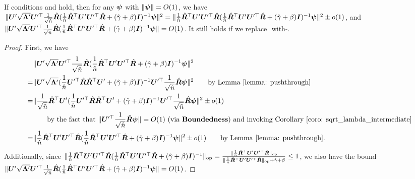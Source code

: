 \begin{corollary}\label{coro: sqrt_lambda}
If conditions \bounded{} and \conc{} hold, then for any ${\bm{\psi}}$ with $\|{\bm{\psi}}\|=O(1)$, we have $\| {\bm{U}}' \sqrt{{\bm{\Lambda}}'}{\bm{U}}'^\top\frac{1}{\sqrt{\hat{n}}} \hat{{\bm{R}}}(\frac{1}{\hat{n}}\hat{{\bm{R}}}^\top{\bm{U}}'{\bm{U}}'^\top\hat{{\bm{R}}} +(\hat{\gamma}+\beta){\bm{I}} )^{-1} {\bm{\psi}}  \|^2 =  \| \frac{1}{\hat{n}}\hat{{\bm{R}}}^\top {\bm{U}}'{\bm{U}}'^\top \hat{{\bm{R}}} ( \frac{1}{\hat{n}}\hat{{\bm{R}}}^\top{\bm{U}}'{\bm{U}}'^\top\hat{{\bm{R}}} + (\hat{\gamma}+\beta){\bm{I}} )^{-1} {\bm{\psi}}\|^2  \pm o(1) $, and $\| {\bm{U}}' \sqrt{{\bm{\Lambda}}'}{\bm{U}}'^\top\frac{1}{\sqrt{\hat{n}}} \hat{{\bm{R}}}(\frac{1}{\hat{n}}\hat{{\bm{R}}}^\top{\bm{U}}'{\bm{U}}'^\top\hat{{\bm{R}}} +(\hat{\gamma}+\beta){\bm{I}} )^{-1} {\bm{\psi}}  \| = O(1)$. It still holds if we replace $\hat{}$ with $\tilde{}$.
\end{corollary}
\begin{proof}
First, we have
    \begin{align}
\nonumber
   & \| {\bm{U}}' \sqrt{{\bm{\Lambda}}'}{\bm{U}}'^\top\frac{1}{\sqrt{\hat{n}}} \hat{{\bm{R}}}(\frac{1}{\hat{n}}\hat{{\bm{R}}}^\top{\bm{U}}'{\bm{U}}'^\top\hat{{\bm{R}}} +(\hat{\gamma}+\beta){\bm{I}} )^{-1} {\bm{\psi}}  \|^2 \\
   \nonumber
   = & \| {\bm{U}}' \sqrt{{\bm{\Lambda}}'}(\frac{1}{\hat{n}}{\bm{U}}'^\top\hat{{\bm{R}}}\hat{{\bm{R}}}^\top{\bm{U}}' +(\hat{\gamma}+\beta){\bm{I}} )^{-1}{\bm{U}}'^\top\frac{1}{\sqrt{\hat{n}}} \hat{{\bm{R}}} {\bm{\psi}}  \|^2 \quad\quad\text{by Lemma \ref{lemma: pushthrough}} \\
    \nonumber
    = & \| \frac{1}{\sqrt{\hat{n}}}\hat{{\bm{R}}}^\top {\bm{U}}' ( \frac{1}{\hat{n}}{\bm{U}}'^\top\hat{{\bm{R}}}\hat{{\bm{R}}}^\top{\bm{U}}' + (\hat{\gamma}+\beta){\bm{I}} )^{-1}{\bm{U}}'^\top\frac{1}{\sqrt{\hat{n}}} \hat{{\bm{R}}} {\bm{\psi}}\|^2  \pm o(1) \\
    \nonumber
   & \quad\quad\text{by the fact that $\|  {\bm{U}}'^\top\frac{1}{\sqrt{\hat{n}} }\hat{{\bm{R}}}{\bm{\psi}}\|=O(1)$ (via \textbf{Boundedness}{}) and invoking Corollary \ref{coro: sqrt_lambda_intermediate} }  \\
    \nonumber
    = & \| \frac{1}{\hat{n}}\hat{{\bm{R}}}^\top {\bm{U}}'{\bm{U}}'^\top \hat{{\bm{R}}} ( \frac{1}{\hat{n}}\hat{{\bm{R}}}^\top{\bm{U}}'{\bm{U}}'^\top\hat{{\bm{R}}} + (\hat{\gamma}+\beta){\bm{I}} )^{-1} {\bm{\psi}}\|^2  \pm o(1)  \quad\quad\text{by Lemma \ref{lemma: pushthrough}}.
\end{align}
Additionally, since $\lVert  \frac{1}{\hat{n}}\hat{{\bm{R}}}^\top {\bm{U}}'{\bm{U}}'^\top \hat{{\bm{R}}} ( \frac{1}{\hat{n}}\hat{{\bm{R}}}^\top{\bm{U}}'{\bm{U}}'^\top\hat{{\bm{R}}} + (\hat{\gamma}+\beta){\bm{I}} )^{-1} \rVert_{\mathrm{op}} = \frac{ \lVert \frac{1}{\hat{n}}\hat{{\bm{R}}}^\top {\bm{U}}'{\bm{U}}'^\top \hat{{\bm{R}}} \rVert_{\mathrm{op}} }{\lVert \frac{1}{\hat{n}}\hat{{\bm{R}}}^\top {\bm{U}}'{\bm{U}}'^\top \hat{{\bm{R}}} \rVert_{\mathrm{op}}+\hat{\gamma}+\beta} \leq 1$, we also have the bound $ \| {\bm{U}}' \sqrt{{\bm{\Lambda}}'}{\bm{U}}'^\top\frac{1}{\sqrt{\hat{n}}} \hat{{\bm{R}}}(\frac{1}{\hat{n}}\hat{{\bm{R}}}^\top{\bm{U}}'{\bm{U}}'^\top\hat{{\bm{R}}} +(\hat{\gamma}+\beta){\bm{I}} )^{-1} {\bm{\psi}}  \| = O(1)$.
\end{proof}


